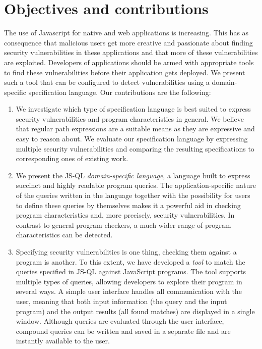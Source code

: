 \section{Objectives and contributions}
The use of Javascript for native and web applications is increasing. This has as consequence that malicious users get more creative and passionate about finding security vulnerabilities in these applications and that more of these vulnerabilities are exploited. Developers of applications should be armed with appropriate tools to find these vulnerabilities before their application gets deployed. We present such a tool that can be configured to detect vulnerabilities using a domain-specific specification language. Our contributions are the following:
\begin{enumerate}
\item We investigate which type of specification language is best suited to express security vulnerabilities and program characteristics in general. We believe that regular path expressions are a suitable means as they are expressive and easy to reason about. We evaluate our specification language by expressing multiple security vulnerabilities and comparing the resulting specifications to corresponding ones of existing work.
\item We present the JS-QL \textit{domain-specific language}, a language built to express succinct and highly readable program queries. The application-specific nature of the queries written in the language together with the possibility for users to define these queries by themselves makes it a powerful aid in checking program characteristics and, more precisely, security vulnerabilities. In contrast to general program checkers, a much wider range of program characteristics can be detected.
\item Specifying security vulnerabilities is one thing, checking them against a program is another. To this extent, we have developed a \textit{tool} to match the queries specified in JS-QL against JavaScript programs. The tool supports multiple types of queries, allowing developers to explore their program in several ways. A simple user interface handles all communication with the user, meaning that both input information (the query and the input program) and the output results (all found matches) are displayed in a single window. Although queries are evaluated through the user interface, compound queries can be written and saved in a separate file and are instantly available to the user.
\end{enumerate} 


